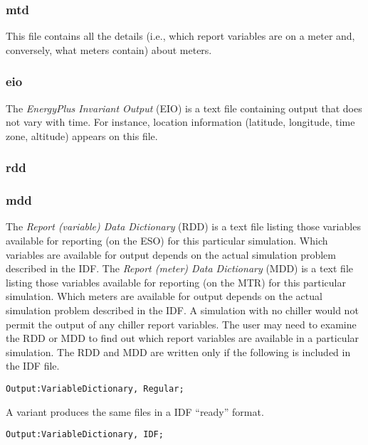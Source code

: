 \subsubsection{mtd}\label{mtd}

This file contains all the details (i.e., which report variables are on a meter and, conversely, what meters contain) about meters.

\subsubsection{eio}\label{eio}

The \emph{EnergyPlus Invariant Output} (EIO) is a text file containing output that does not vary with time. For instance, location information (latitude, longitude, time zone, altitude) appears on this file.

\subsubsection{rdd}\label{rdd}

\subsubsection{mdd}\label{mdd}

The \emph{Report (variable) Data Dictionary} (RDD) is a text file listing those variables available for reporting (on the ESO) for this particular simulation. Which variables are available for output depends on the actual simulation problem described in the IDF. The \emph{Report (meter) Data Dictionary} (MDD) is a text file listing those variables available for reporting (on the MTR) for this particular simulation. Which meters are available for output depends on the actual simulation problem described in the IDF. A simulation with no chiller would not permit the output of any chiller report variables. The user may need to examine the RDD or MDD to find out which report variables are available in a particular simulation. The RDD and MDD are written only if the following is included in the IDF file.

\begin{lstlisting}
Output:VariableDictionary, Regular;
\end{lstlisting}

A variant produces the same files in a IDF ``ready'' format.

\begin{lstlisting}
Output:VariableDictionary, IDF;
\end{lstlisting}

